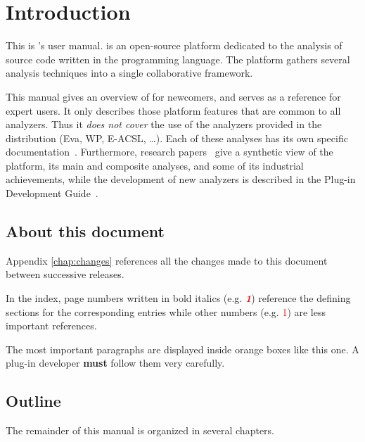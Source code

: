 \chapter{Introduction}
\label{user-intro}

This is \FramaC's user manual.
\FramaC is an open-source platform dedicated to
the analysis of source code written in the  programming
language. The \FramaC platform gathers several analysis techniques into
a single collaborative framework.

This manual gives an overview of \FramaC for newcomers,
and serves as a reference for expert users.
It only describes those platform features that are common to all analyzers.
Thus it \emph{does not cover} the use of the analyzers provided in the \FramaC
distribution (Eva, WP, E-ACSL, \ldots). Each of these analyses has its
own specific documentation~\cite{wp,value,eacsl}. Furthermore, research
papers~\cite{sefm12,fac15} give a synthetic view of the platform, its main and
composite analyses, and some of its industrial achievements, while the
development of new analyzers is described in the Plug-in Development
Guide~\cite{plugin-dev-guide}.

\section{About this document}

Appendix \ref{chap:changes} references all the changes made to this document
between successive \FramaC releases.

In the index, page numbers written in bold italics (e.g.
\textcolor{red}{\textit{\textbf{1}}}) reference the defining sections for the
corresponding entries while other numbers (e.g. \textcolor{red}{1}) are
less important references.

\begin{important}
The most important paragraphs are displayed inside orange boxes like this one.
A plug-in developer \textbf{must} follow them very carefully.
\end{important}

\section{Outline}

The remainder of this manual is organized in several chapters.

